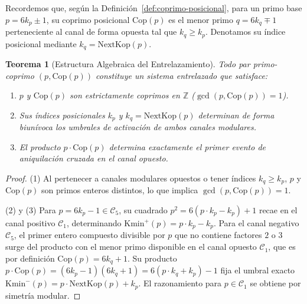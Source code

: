 \documentclass{article}
\numberwithin{equation}{section}
\theoremstyle{plain}
\newtheorem{theorem}{Teorema}[section]
\theoremstyle{definition}
\begin{document}
Recordemos que, según la Definición~\ref{def:coprimo-posicional}, para un primo base $p = 6k_p \pm 1$, su coprimo posicional $\mathrm{Cop}(p)$ es el menor primo $q = 6k_q \mp 1$ perteneciente al canal de forma opuesta tal que $k_q \ge k_p$. Denotamos su índice posicional mediante $k_q = \mathrm{NextKop}(p)$.

\begin{theorem}[Estructura Algebraica del Entrelazamiento]
\label{thm:estructura-entrelazamiento}
Todo par primo-coprimo $(p, \mathrm{Cop}(p))$ constituye un sistema entrelazado que satisface:
\begin{enumerate}
    \item $p$ y $\mathrm{Cop}(p)$ son estrictamente coprimos en $\mathbb{Z}$ ($\gcd(p, \mathrm{Cop}(p)) = 1$).
    \item Sus índices posicionales $k_p$ y $k_q = \mathrm{NextKop}(p)$ determinan de forma biunívoca los umbrales de activación de ambos canales modulares.
    \item El producto $p \cdot \mathrm{Cop}(p)$ determina exactamente el primer evento de aniquilación cruzada en el canal opuesto.
\end{enumerate}
\end{theorem}

\begin{proof}
(1) Al pertenecer a canales modulares opuestos o tener índices $k_q \ge k_p$, $p$ y $\mathrm{Cop}(p)$ son primos enteros distintos, lo que implica $\gcd(p, \mathrm{Cop}(p)) = 1$.

(2) y (3) Para $p = 6k_p - 1 \in \mathcal{C}_5$, su cuadrado $p^2 = 6(p \cdot k_p - k_p) + 1$ recae en el canal positivo $\mathcal{C}_1$, determinando $\mathrm{Kmin}^+(p) = p \cdot k_p - k_p$. Para el canal negativo $\mathcal{C}_5$, el primer entero compuesto divisible por $p$ que no contiene factores $2$ o $3$ surge del producto con el menor primo disponible en el canal opuesto $\mathcal{C}_1$, que es por definición $\mathrm{Cop}(p) = 6 k_q + 1$. Su producto $p \cdot \mathrm{Cop}(p) = (6k_p - 1)(6k_q + 1) = 6(p \cdot k_q + k_p) - 1$ fija el umbral exacto $\mathrm{Kmin}^-(p) = p \cdot \mathrm{NextKop}(p) + k_p$. El razonamiento para $p \in \mathcal{C}_1$ se obtiene por simetría modular.
\end{proof}
\end{document}
